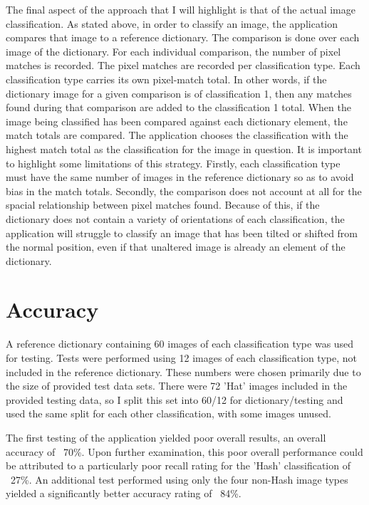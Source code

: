 \documentclass[11pt]{article} %
\begin{document}
The final aspect of the approach that I will highlight is that of the actual image classification. As stated above, in order to classify an image, the application compares that image to a reference dictionary. The comparison is done over each image of the dictionary. For each individual comparison, the number of pixel matches is recorded. The pixel matches are recorded per classification type. Each classification type carries its own pixel-match total. In other words, if the dictionary image for a given comparison is of classification 1, then any matches found during that comparison are added to the classification 1 total. When the image being classified has been compared against each dictionary element, the match totals are compared. The application chooses the classification with the highest match total as the classification for the image in question. It is important to highlight some limitations of this strategy. Firstly, each classification type must have the same number of images in the reference dictionary so as to avoid bias in the match totals. Secondly, the comparison does not account at all for the spacial relationship between pixel matches found. Because of this, if the dictionary does not contain a variety of orientations of each classification, the application will struggle to classify an image that has been tilted or shifted from the normal position, even if that unaltered image is already an element of the dictionary. 

\section{Accuracy}

A reference dictionary containing 60 images of each classification type was used for testing. Tests were performed using 12 images of each classification type, not included in the reference dictionary. These numbers were chosen primarily due to the size of provided test data sets. There were 72 'Hat' images included in the provided testing data, so I split this set into 60/12 for dictionary/testing and used the same split for each other classification, with some images unused.

The first testing of the application yielded poor overall results, an overall accuracy of ~70\%. Upon further examination, this poor overall performance could be attributed to a particularly poor recall rating for the 'Hash' classification of ~27\%. An additional test performed using only the four non-Hash image types yielded a significantly better accuracy rating of ~84\%. 
\end{document}
